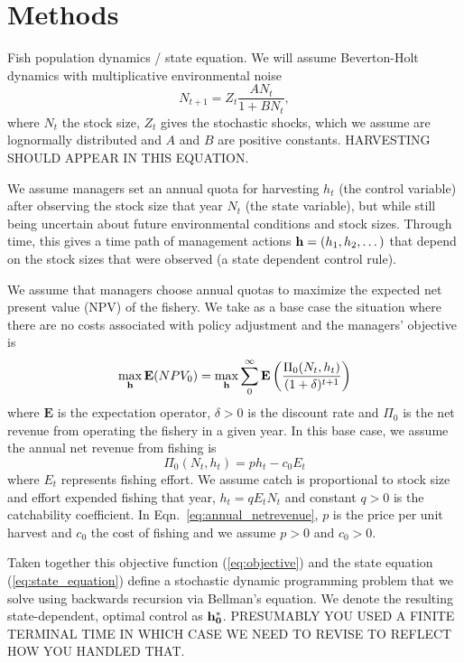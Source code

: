 \documentclass{article}\usepackage{graphicx, color}
\begin{document}
\section{Methods}

 Fish population dynamics / state equation.  We will assume Beverton-Holt dynamics with multiplicative environmental noise
    \begin{equation} 
      N_{t+1} = Z_t \frac{A N_t}{1 + B N_t}, 
\label{eq:state_equation}
    \end{equation}
where $N_t$ the stock size, $Z_t$ gives the stochastic shocks, which we assume are lognormally distributed and $A$ and $B$ are positive constants. HARVESTING SHOULD APPEAR IN THIS EQUATION.

We assume managers set an annual quota for harvesting $h_t$ (the control variable) after observing the stock size that year $N_t$ (the state variable), but while still being uncertain about future environmental conditions and stock sizes. Through time, this gives a time path of management actions ${\bf h}=(h_1,h_2,\dots)$ that depend on the stock sizes that were observed (a state dependent control rule). 

We assume that managers choose annual quotas to maximize the expected net present value (NPV) of the fishery. We take as a base case the situation where there are no costs associated with policy adjustment and the managers' objective is
\begin{equation}
\max_{{\bf h}}\mathbf{ E} ( NPV_{0} )=\max_{{\bf h}} \sum_0^\infty \mathbf{E} \left( \displaystyle \frac{\Pi_0(N_t,h_t)}{(1+\delta)^{t+1}} \right)
\label{eq:objective}
\end{equation}
where $\mathbf{E}$ is the expectation operator, $\delta>0$ is the discount rate and $\Pi_0$ is the net revenue from operating the fishery in a given year. In this base case, we assume the annual net revenue from fishing is 
  \begin{equation} 
    \Pi_0(N_t,h_t) = p h_t -  c_0 E_t
\label{eq:annual_netrevenue}
  \end{equation}
  where $E_t$ represents
  fishing effort. We assume catch is proportional to stock size and effort expended fishing that year, $h_t=qE_tN_t$ and constant $q>0$ is the catchability coefficient. In Eqn.~\ref{eq:annual_netrevenue}, $p$ is the price per unit harvest and $c_0$ the cost of fishing and we assume $p>0$ and $c_0>0$.

Taken together this objective function (\ref{eq:objective}) and the state equation (\ref{eq:state_equation}) define a stochastic dynamic programming problem that we solve using backwards recursion via Bellman's equation. We denote the resulting state-dependent, optimal control as ${\bf h_0^*}$. PRESUMABLY YOU USED A FINITE TERMINAL TIME IN WHICH CASE WE NEED TO REVISE TO REFLECT HOW YOU HANDLED THAT.
\end{document}
